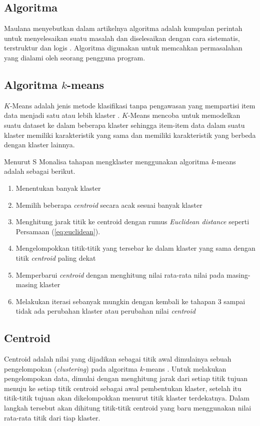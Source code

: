 \subsection{Algoritma}

Maulana menyebutkan dalam artikelnya algoritma adalah kumpulan perintah untuk menyelesaikan suatu masalah dan diselesaikan dengan cara sistematis, terstruktur dan logis \cite{maulana2017pembelajaran}. Algoritma digunakan untuk memcahkan permasalahan yang dialami oleh seorang pengguna program.

\subsection{Algoritma $k$-means}

$K$-Means adalah jenis metode klasifikasi tanpa pengawasan yang mempartisi item data menjadi satu atau lebih klaster \cite{agusta2007k}. $K$-Means mencoba untuk memodelkan suatu dataset ke dalam beberapa klaster sehingga item-item data dalam suatu klaster memiliki karakteristik yang sama dan memiliki karakteristik yang berbeda dengan klaster lainnya.

Menurut S Monalisa \cite{monalisa2018klasterisasi} tahapan mengklaster menggunakan algoritma \textit{k}-means adalah sebagai berikut.

\begin{enumerate}
	\item Menentukan banyak klaster
	\item Memilih beberapa \textit{centroid} secara acak sesuai banyak klaster
	\item Menghitung jarak titik ke centroid dengan rumus \textit{Euclidean distance} seperti Persamaan (\ref{eq:euclidean}).
	\item Mengelompokkan titik-titik yang tersebar ke dalam klaster yang sama dengan titik \textit{centroid} paling dekat
	\item Memperbarui \textit{centroid} dengan menghitung nilai rata-rata nilai pada masing-masing klaster
	\item Melakukan iterasi sebanyak mungkin dengan kembali ke tahapan 3 sampai tidak ada perubahan klaster atau perubahan nilai \textit{centroid}
\end{enumerate}

\subsection{Centroid}

Centroid adalah nilai yang dijadikan sebagai titik awal dimulainya sebuah pengelompokan (\textit{clustering}) pada algoritma $k$-means \cite{retno2019peningkatan}. Untuk melakukan pengelompokan data, dimulai dengan menghitung jarak dari setiap titik tujuan menuju ke setiap titik centroid sebagai awal pembentukan klaster, setelah itu titik-titik tujuan akan dikelompokkan menurut titik klaster terdekatnya. Dalam langkah tersebut akan dihitung titik-titik centroid yang baru menggunakan nilai rata-rata titik dari tiap klaster.

